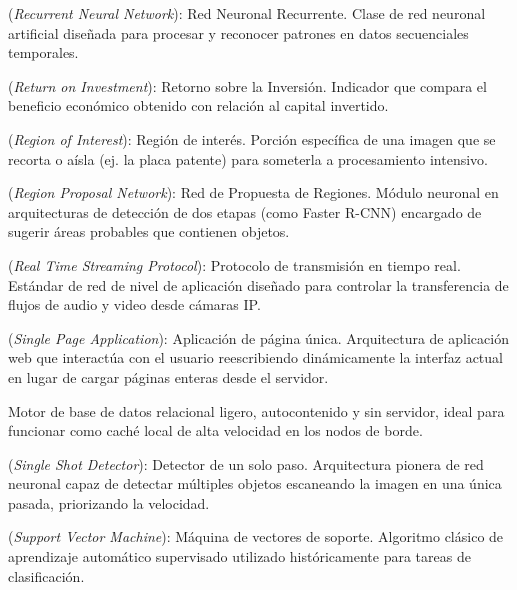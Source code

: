 \begin{description}[leftmargin=3cm, style=nextline]
    \item[RNN] (\textit{Recurrent Neural Network}): Red Neuronal Recurrente. Clase de red neuronal artificial diseñada para procesar y reconocer patrones en datos secuenciales temporales.
    
    \item[ROI (Finanzas)] (\textit{Return on Investment}): Retorno sobre la Inversión. Indicador que compara el beneficio económico obtenido con relación al capital invertido.
    
    \item[ROI (Visión Computacional)] (\textit{Region of Interest}): Región de interés. Porción específica de una imagen que se recorta o aísla (ej. la placa patente) para someterla a procesamiento intensivo.
    
    \item[RPN] (\textit{Region Proposal Network}): Red de Propuesta de Regiones. Módulo neuronal en arquitecturas de detección de dos etapas (como Faster R-CNN) encargado de sugerir áreas probables que contienen objetos.
    
    \item[RTSP] (\textit{Real Time Streaming Protocol}): Protocolo de transmisión en tiempo real. Estándar de red de nivel de aplicación diseñado para controlar la transferencia de flujos de audio y video desde cámaras IP.
    
    \item[SPA] (\textit{Single Page Application}): Aplicación de página única. Arquitectura de aplicación web que interactúa con el usuario reescribiendo dinámicamente la interfaz actual en lugar de cargar páginas enteras desde el servidor.
    
    \item[SQLite] Motor de base de datos relacional ligero, autocontenido y sin servidor, ideal para funcionar como caché local de alta velocidad en los nodos de borde.
    
    \item[SSD] (\textit{Single Shot Detector}): Detector de un solo paso. Arquitectura pionera de red neuronal capaz de detectar múltiples objetos escaneando la imagen en una única pasada, priorizando la velocidad.
    
    \item[SVM] (\textit{Support Vector Machine}): Máquina de vectores de soporte. Algoritmo clásico de aprendizaje automático supervisado utilizado históricamente para tareas de clasificación.
    

\end{description}
